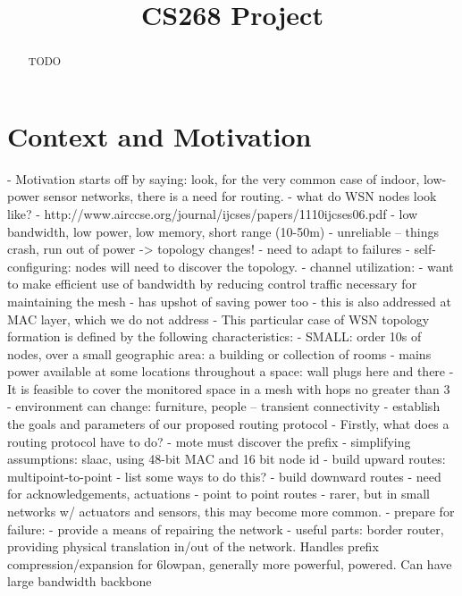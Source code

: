 \documentclass[conference]{IEEEtran}
\begin{document}
\title{CS268 Project}

\author{
\and
{}
}

\maketitle

\begin{abstract}
TODO
\end{abstract}



\section{Context and Motivation}
- Motivation starts off by saying: look, for the very common case of indoor, low-power
  sensor networks, there is a need for routing.
- what do WSN nodes look like?
    - http://www.airccse.org/journal/ijcses/papers/1110ijcses06.pdf
    - low bandwidth, low power, low memory, short range (10-50m)
    - unreliable -- things crash, run out of power -> topology changes!
      - need to adapt to failures
    - self-configuring: nodes will need to discover the topology.
    - channel utilization:
      - want to make efficient use of bandwidth by reducing control traffic
        necessary for maintaining the mesh
      - has upshot of saving power too
      - this is also addressed at MAC layer, which we do not address
- This particular case of WSN topology formation is defined by the following characteristics:
    - SMALL: order 10s of nodes, over a small geographic area: a building or collection of rooms
    - mains power available at some locations throughout a space: wall plugs here and there
    - It is feasible to cover the monitored space in a mesh with hops no greater than 3
    - environment can change: furniture, people -- transient connectivity
- establish the goals and parameters of our proposed routing protocol
- Firstly, what does a routing protocol have to do?
    - mote must discover the prefix
      - simplifying assumptions: slaac, using 48-bit MAC and 16 bit node id
    - build upward routes: multipoint-to-point
      - list some ways to do this?
    - build downward routes
      - need for acknowledgements, actuations
    - point to point routes
      - rarer, but in small networks w/ actuators and sensors, this may become more common.
    - prepare for failure:
      - provide a means of repairing the network
    - useful parts: border router, providing physical translation in/out of
      the network. Handles prefix compression/expansion for 6lowpan, generally
      more powerful, powered. Can have large bandwidth backbone
\fi
\end{document}
